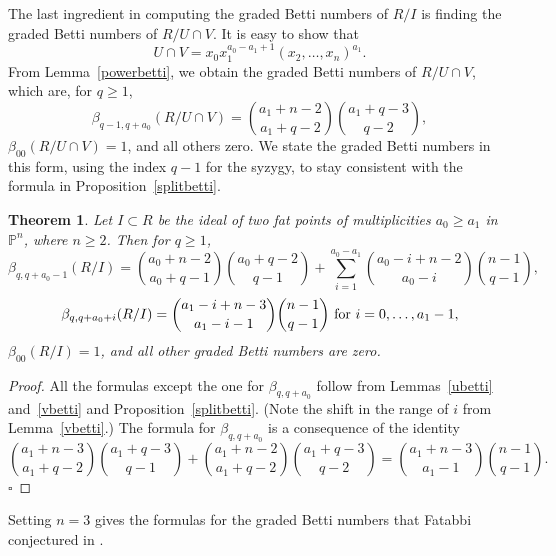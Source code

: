 \documentclass{article}
\begin{document}
The last ingredient in computing the graded Betti numbers of $R/I$ is finding the graded Betti numbers of $R/U \cap V$. It is easy to show that \[ U \cap V = x_0x_1^{a_0-a_1+1}(x_2,\dots,x_n)^{a_1}. \] From Lemma~\ref{powerbetti}, we obtain the graded Betti numbers of $R/U \cap V$, which are, for $q \ge 1$, \[ \beta_{q-1,q+a_0}(R/U \cap V)={a_1+n-2 \choose a_1+q-2}{a_1+q-3 \choose q-2},\] $\beta_{00}(R/U \cap V)=1$, and all others zero. We state the graded Betti numbers in this form, using the index $q-1$ for the syzygy, to stay consistent with the formula in Proposition~\ref{splitbetti}.

\newtheorem{theorem}[definition]{Theorem}
\begin{theorem}
\label{twobetti}
Let $I \subset R$ be the ideal of two fat points of multiplicities $a_0 \ge a_1$ in $\mathbb P^n$, where $n \ge 2$. Then for $q \ge 1$, \[ \beta_{q,q+a_0-1}(R/I) = {a_0+n-2 \choose a_0+q-1}{a_0+q-2 \choose q-1} + \sum_{i=1}^{a_0-a_1} {a_0-i+n-2 \choose a_0-i}{n-1 \choose q-1}, \] \[ \beta_{q,q+a_0+i}(R/I)={a_1-i+n-3 \choose a_1-i-1}{n-1 \choose q-1} \hbox{ for } i=0,\dots,a_1-1 ,\] $\beta_{00}(R/I)=1$, and all other graded Betti numbers are zero.
\end{theorem}

\begin{proof}
All the formulas except the one for $\beta_{q,q+a_0}$ follow from Lemmas~\ref{ubetti} and~\ref{vbetti} and Proposition~\ref{splitbetti}. (Note the shift in the range of $i$ from Lemma~\ref{vbetti}.) The formula for $\beta_{q,q+a_0}$ is a consequence of the identity \[ {a_1+n-3 \choose a_1+q-2}{a_1+q-3 \choose q-1} + {a_1+n-2 \choose a_1+q-2}{a_1+q-3 \choose q-2} = {a_1+n-3 \choose a_1-1}{n-1 \choose q-1}.\] \hfill $\square$
\end{proof}

Setting $n=3$ gives the formulas for the graded Betti numbers that Fatabbi conjectured in \cite{Fatabbi}.
\end{document}
